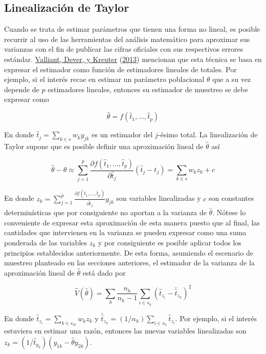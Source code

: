 \documentclass[
  12pt,
  spanish,
]{book}
\begin{document}
\hypertarget{linealizaciuxf3n-de-taylor}{%
\subsection{Linealización de Taylor}\label{linealizaciuxf3n-de-taylor}}

Cuando se trata de estimar parámetros que tienen una forma no lineal, es posible recurrir al uso de las herramientas del análisis matemático para aproximar sus varianzas con el fin de publicar las cifras oficiales con sus respectivos errores estándar. \protect\hyperlink{ref-Valliant_Dever_Kreuter_2013}{Valliant, Dever, y Kreuter} (\protect\hyperlink{ref-Valliant_Dever_Kreuter_2013}{2013}) mencionan que esta técnica se basa en expresar el estimador como función de estimadores lineales de totales. Por ejemplo, si el interés recae en estimar un parámetro poblacional \(\theta\) que a su vez depende de \(p\) estimadores lineales, entonces su estimador de muestreo se debe expresar como

\[
\hat{\theta}=f(\hat{t}_1, \ldots, \hat{t}_p)
\]

En donde \(\hat{t}_j=\sum_{k\in s}w_k y_{jk}\) es un estimador del \(j\)-ésimo total. La linealización de Taylor supone que es posible definir una aproximación lineal de \(\hat{\theta}\) así

\[
\hat{\theta} - \theta 
\approx \sum_{j=1}^p \frac{\partial f(\hat{t}_1, \ldots, \hat{t}_p) }{\partial \hat{t}_j}(\hat{t}_j - t_j)
= \sum_{k\in s} w_k z_k + c
\]

En donde \(z_k= \sum_{j=1}^p \frac{\partial f(\hat{t}_1, \ldots, \hat{t}_p) }{\partial \hat{t}_j} y_{jk}\) son variables linealizadas y \(c\) son constantes determinísticas que por consiguiente no aportan a la varianza de \(\hat{\theta}\). Nótese lo conveniente de expresar esta aproximación de esta manera puesto que al final, las cantidades que intervienen en la varianza se pueden expresar como una suma ponderada de las variables \(z_k\) y por consiguiente es posible aplicar todos los principios establecidos anteriormente. De esta forma, asumiendo el escenario de muestreo planteado en las secciones anteriores, el estimador de la varianza de la aproximación lineal de \(\hat{\theta}\) está dado por

\[
\hat{V}(\hat{\theta}) = 
\sum_h\frac{n_h}{n_h-1}\sum_{i\in s_h}\left(\hat{t}_{z_i}-\bar{\hat{t}}_{z_h}\right)^2
\]

En donde \(\hat{t}_{z_i} = \sum_{k \in s_{hi}} w_k z_k\) y \(\bar{\hat{t}}_{z_h}=(1/n_h)\sum_{i \in s_h}\hat{t}_{z_i}\). Por ejemplo, si el interés estuviera en estimar una razón, entonces las nuevas variables linealizadas son \(z_k=(1/\hat{t}_{y_2})(y_{1k}-\hat{\theta}y_{2k})\).
\end{document}
